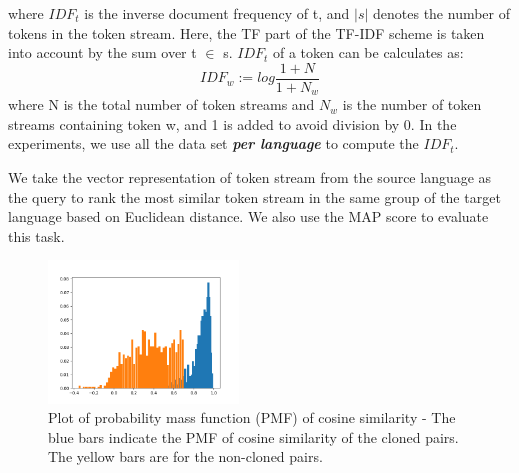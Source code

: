 where \begin{math}IDF_{t} \end{math} is the inverse document frequency of t, and \begin{math}|s|\end{math} denotes the number of tokens in the token stream. Here, the TF part of the TF-IDF scheme is taken into account by the sum over t \begin{math}\in\end{math} s. \begin{math}IDF_{t} \end{math} of a token can be calculates as:
\begin{displaymath}
IDF_{w} := log \frac{1 + N}{1 + N_{w}}
\end{displaymath}
where N is the total number of token streams and \begin{math}N_{w}\end{math} is the number of token streams containing token w, and 1 is added to avoid division by 0. In the experiments, we use all the data set \textbf{\textit{per language}} to compute the \begin{math}IDF_{t} \end{math}.

We take the vector representation of token stream from the source language as the query to rank the most similar token stream in the same group of the target language based on Euclidean distance. We also use the MAP score to evaluate this task.

\begin{figure}[t!]
	\includegraphics[width=0.45\textwidth]{clone_distribution}
	\caption{Plot of probability mass function (PMF) of cosine similarity - The blue bars indicate the PMF of cosine similarity of the cloned pairs. The yellow bars are for the non-cloned pairs.}
	\label{fig:clone_distribution}
\end{figure}


